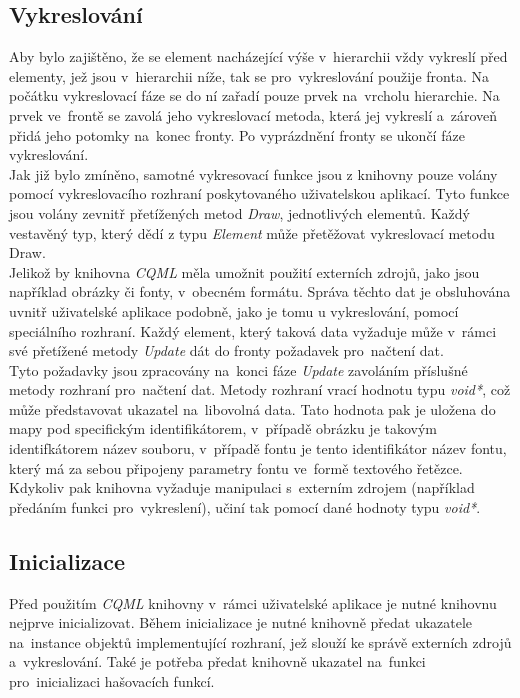 \documentclass[11pt,twoside,a4paper]{book}
\begin{document}
\subsection {Vykreslování}
Aby bylo zajištěno, že se element nacházející výše v~hierarchii vždy vykreslí před elementy, jež jsou v~hierarchii níže, tak se pro~vykreslování použije fronta. Na počátku vykreslovací fáze se do ní zařadí pouze prvek na~vrcholu hierarchie. Na prvek ve~frontě se zavolá jeho vykreslovací metoda, která jej vykreslí a~zároveň přidá jeho potomky na~konec fronty. Po vyprázdnění fronty se ukončí fáze vykreslování.\\
Jak již bylo zmíněno, samotné vykresovací funkce jsou z knihovny pouze volány pomocí vykreslovacího rozhraní poskytovaného uživatelskou aplikací. Tyto funkce jsou volány zevnitř přetížených metod \textit{Draw}, jednotlivých elementů. Každý vestavěný typ, který dědí z typu \textit{Element} může přetěžovat vykreslovací metodu Draw.\\
Jelikož by knihovna \textit{CQML} měla umožnit použití externích zdrojů, jako jsou například obrázky či fonty, v~obecném formátu. Správa těchto dat je obsluhována uvnitř uživatelské aplikace podobně, jako je tomu u vykreslování, pomocí speciálního rozhraní. Každý element, který taková data vyžaduje může v~rámci své přetížené metody \textit{Update} dát do fronty požadavek pro~načtení dat.\\
Tyto požadavky jsou zpracovány na~konci fáze \textit{Update} zavoláním příslušné metody rozhraní pro~načtení dat. Metody rozhraní vrací hodnotu typu \textit{void*}, což může představovat ukazatel na~libovolná data. Tato hodnota pak je uložena do mapy pod specifickým identifikátorem, v~případě obrázku je takovým identifkátorem název souboru, v~případě fontu je tento identifikátor název fontu, který má za sebou připojeny parametry fontu ve~formě textového řetězce. Kdykoliv pak knihovna vyžaduje manipulaci s~externím zdrojem (například předáním funkci pro~vykreslení), učiní tak pomocí dané hodnoty typu \textit{void*}. \\
\subsection {Inicializace}
Před použitím \textit{CQML} knihovny v~rámci uživatelské aplikace je nutné knihovnu nejprve inicializovat. Během inicializace je nutné knihovně předat ukazatele na~instance objektů implementující rozhraní, jež slouží ke správě externích zdrojů a~vykreslování. Také je potřeba předat knihovně ukazatel na~funkci pro~inicializaci hašovacích funkcí.\\
\end{document}
